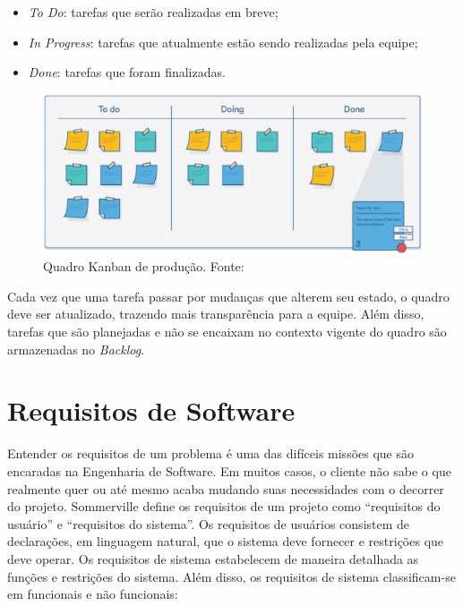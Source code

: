     \begin{itemize}
        \item \textit{To Do}: tarefas que serão realizadas em breve;
        \item \textit{In Progress}: tarefas que atualmente estão sendo realizadas pela equipe;
        \item \textit{Done}: tarefas que foram finalizadas.
    \end{itemize}

    \begin{figure}[!htpb]
        \centering
        \includegraphics[keepaspectratio=true,scale=0.5]{figuras/kanban.eps}
        \caption{Quadro Kanban de produção. Fonte: \cite{radigan_2015}}
        \label{kanban}
    \end{figure}

    Cada vez que uma tarefa passar por mudanças que alterem seu estado, o quadro deve ser atualizado, trazendo mais transparência para a equipe. Além disso, tarefas que são planejadas e não se encaixam no contexto vigente do quadro são armazenadas no \textit{Backlog}.

\section{Requisitos de Software}
Entender os requisitos de um problema é uma das difíceis missões
que são encaradas na Engenharia de Software. Em muitos casos, o cliente não sabe o que realmente quer ou até mesmo
acaba mudando suas necessidades com o decorrer do projeto. Sommerville \cite{sommerville_2006} define os requisitos de um projeto como ``requisitos do usuário'' e ``requisitos do sistema''. Os requisitos de usuários consistem de declarações, em
linguagem natural, que o sistema deve fornecer e restrições que deve
operar. Os requisitos de sistema estabelecem de maneira detalhada as
funções e restrições do sistema. Além disso, os requisitos de sistema
classificam-se em funcionais e não funcionais:

